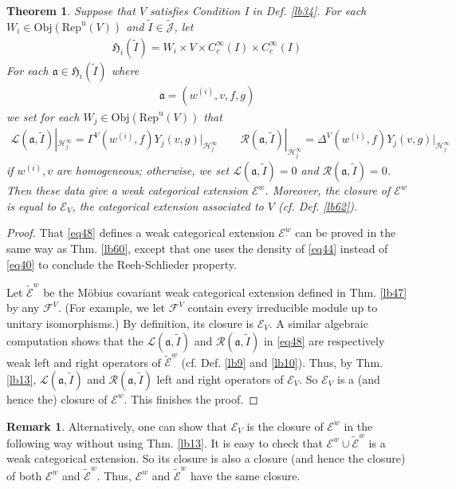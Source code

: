 \documentclass[11pt,b5paper,notitlepage]{article}
\theoremstyle{definition}
\newtheorem{rem}[df]{Remark}
\theoremstyle{plain}
\newtheorem{thm}[df]{Theorem}
\newcommand{\fk}{\mathfrak}
\newcommand{\mc}{\mathcal}
\newcommand{\wtd}{\widetilde}
\newcommand{\uni}{\mathrm{u}}
\newcommand{\scr}{\mathscr}
\newcommand{\Jtd}{\widetilde{\mathcal J}}
\newcommand{\RepV}{{\mathrm{Rep}^\uni(V)}}
\newcommand{\Obj}{\mathrm{Obj}}
\numberwithin{equation}{section}
\begin{document}
\begin{thm}
Suppose that $V$ satisfies Condition I in Def. \ref{lb34}. For each $W_i\in\Obj(\RepV)$ and $\wtd I\in\Jtd$, let
\begin{gather}
\fk H_i(\wtd I)=W_i\times V\times C_c^\infty(I)\times C_c^\infty(I)
\end{gather}
For each $\fk a\in\fk H_i(\wtd I)$ where
\begin{align*}
\fk a=(w^{(i)},v,f,g)
\end{align*}
we set for each $W_j\in\Obj(\RepV)$ that
\begin{align}\label{eq48}
\mc L(\fk a,\wtd I)|_{\mc H_j^\infty}=\Gamma^V(w^{(i)},f)Y_j(v,g)\big|_{\mc H_j^\infty}\qquad \mc R(\fk a,\wtd I)|_{\mc H_j^\infty}=\Delta^V(w^{(i)},f)Y_j(v,g)\big|_{\mc H_j^\infty}
\end{align}
if $w^{(i)},v$ are homogeneous; otherwise,  we set $\mc L(\fk a,\wtd I)=0$ and $\mc R(\fk a,\wtd I)=0$. Then these data give a weak categorical extension $\scr E^w$. Moreover, the closure of $\scr E^w$ is equal to $\scr E_V$, the categorical extension associated to $V$ (cf. Def. \ref{lb62}).
\end{thm}

\begin{proof}
That \eqref{eq48} defines a weak categorical extension $\scr E^w$ can be proved in the same way as Thm. \ref{lb60}, except that one uses the density of \eqref{eq44} instead of \eqref{eq40} to conclude the Reeh-Schlieder property.

Let $\wtd{\scr E}^w$ be the M\"obius covariant weak categorical extension defined in Thm. \ref{lb47} by any $\mc F^V$. (For example, we let $\mc F^V$ contain every irreducible module up to unitary isomorphisms.) By definition, its closure is $\scr E_V$. A similar algebraic computation shows that the $\mc L(\fk a,\wtd I)$ and $\mc R(\fk a,\wtd I)$ in \eqref{eq48} are respectively weak left and right operators of $\wtd{\scr E}^w$ (cf. Def. \ref{lb9} and \ref{lb10}). Thus, by Thm. \ref{lb13}, $\mc L(\fk a,\wtd I)$ and $\mc R(\fk a,\wtd I)$ left and right operators of $\scr E_V$. So $\scr E_V$ is a (and hence the) closure of $\scr E^w$. This finishes the proof.
\end{proof}
\begin{rem}
Alternatively, one can show that $\scr E_V$ is the closure of $\scr E^w$ in the following way without using Thm. \ref{lb13}. It is easy to check that $\scr E^w\cup\wtd{\scr E}^w$ is a weak categorical extension. So its closure is also a closure (and hence the closure) of both $\scr E^w$ and $\wtd{\scr E}^w$. Thus,  $\scr E^w$ and $\wtd{\scr E}^w$ have the same closure.
\end{rem}
\end{document}
